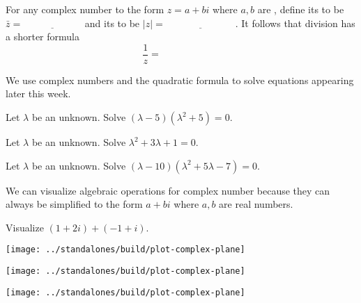 \documentclass[../main.tex]{subfiles}
\begin{document}
For any complex number \underline{\hspace{1in}} to the form \(z = a + bi\) where \(a,b\) are \underline{\hspace{3cm}}, define its  to be \(\bar{z} = \underline{\hspace{1in}}\) and its  to be \(|z| = \underline{\hspace{3cm}}\).  It follows that division has a shorter formula
\[
  \frac{1}{z} = \hspace{1in}
\]

\faStar{} We use complex numbers and the quadratic formula to solve equations appearing later this week.
\begin{example}
  Let \(\lambda\) be an unknown. Solve \((\lambda - 5) (\lambda^{2} + 5) = 0\).
\end{example}

\begin{example}
  Let \(\lambda\) be an unknown. Solve \(\lambda^{2} + 3\lambda + 1 = 0\).
\end{example}

\begin{example}
  Let \(\lambda\) be an unknown. Solve \((\lambda - 10) (\lambda^{2} + 5\lambda - 7) = 0\).
\end{example}

\clearpage

We can visualize algebraic operations for complex number because they can always be simplified to the form \(a + bi\) where \(a,b\) are real numbers.

\begin{example}
  Visualize \((1 + 2i) + ( -1 + i)\).

  \texttt{[image: ../standalones/build/plot-complex-plane]}
\end{example}

\texttt{[image: ../standalones/build/plot-complex-plane]}

\texttt{[image: ../standalones/build/plot-complex-plane]}
\end{document}
